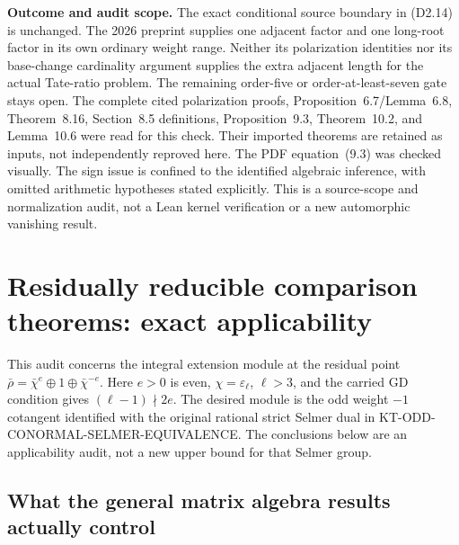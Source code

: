 \documentclass[11pt,a4paper]{article}
\theoremstyle{definition}
\renewcommand{\paragraph}[1]{\par\smallskip\noindent\textbf{#1}\quad\ignorespaces}
\begin{document}
\paragraph{Outcome and audit scope.}
The exact conditional source boundary in (D2.14) is unchanged.
The 2026 preprint supplies one adjacent factor and one long-root
factor in its own ordinary weight range.  Neither its polarization
identities nor its base-change cardinality argument supplies the
extra adjacent length for the actual Tate-ratio problem.  The
remaining order-five or order-at-least-seven gate stays open.
The complete cited polarization proofs, Proposition~6.7/Lemma~6.8,
Theorem~8.16, Section~8.5 definitions, Proposition~9.3,
Theorem~10.2, and Lemma~10.6 were read for this check.  Their imported
theorems are retained as inputs, not independently reproved here.
The PDF equation~(9.3) was checked visually.  The sign issue is
confined to the identified algebraic inference, with omitted
arithmetic hypotheses stated explicitly.  This is a source-scope
and normalization audit, not a Lean kernel verification or a new
automorphic vanishing result.



\section{Residually reducible comparison theorems: exact applicability}
\label{sec:kt-reducible-comparison}

This audit concerns the integral extension module at the residual
point $\bar\rho=\bar\chi^e\oplus1\oplus\bar\chi^{-e}$.
Here $e>0$ is even, $\chi=\varepsilon_\ell$, $\ell>3$, and the
carried GD condition gives $(\ell-1)\nmid2e$.  The desired module
is the odd weight $-1$ cotangent identified with the original
rational strict Selmer dual in KT-ODD-CONORMAL-SELMER-EQUIVALENCE.
The conclusions below are an applicability audit, not a new
upper bound for that Selmer group.

\subsection{What the general matrix algebra results actually control}
\end{document}
